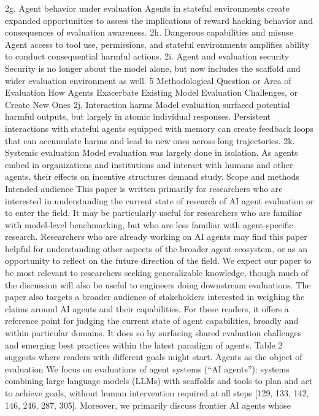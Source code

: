 2g. Agent behavior under evaluation
Agents in stateful environments create expanded opportunities to assess
the implications of reward hacking behavior and consequences of
evaluation awareness.
2h. Dangerous capabilities and misuse
Agent access to tool use, permissions, and stateful environments
amplifies ability to conduct consequential harmful actions.
2i. Agent and evaluation security
Security is no longer about the model alone, but now includes the
scaffold and wider evaluation environment as well.
5
Methodological Question or Area of
Evaluation
How Agents Exacerbate Existing Model Evaluation Challenges, or
Create New Ones
2j. Interaction harms
Model evaluation surfaced potential harmful outputs, but largely in
atomic individual responses. Persistent interactions with stateful agents
equipped with memory can create feedback loops that can accumulate
harms and lead to new ones across long trajectories.
2k. Systemic evaluation
Model evaluation was largely done in isolation. As agents embed in
organizations and institutions and interact with humans and other agents,
their effects on incentive structures demand study.
Scope and methods
Intended audience
This paper is written primarily for researchers who are interested in understanding the current state of
research of AI agent evaluation or to enter the field. It may be particularly useful for researchers who are
familiar with model-level benchmarking, but who are less familiar with agent-specific research. Researchers
who are already working on AI agents may find this paper helpful for understanding other aspects of the
broader agent ecosystem, or as an opportunity to reflect on the future direction of the field. We expect our
paper to be most relevant to researchers seeking generalizable knowledge, though much of the discussion
will also be useful to engineers doing downstream evaluations.
The paper also targets a broader audience of stakeholders interested in weighing the claims around AI
agents and their capabilities. For these readers, it offers a reference point for judging the current state
of agent capabilities, broadly and within particular domains. It does so by surfacing shared evaluation
challenges and emerging best practices within the latest paradigm of agents.
Table 2 suggests where readers with different goals might start.
Agents as the object of evaluation
We focus on evaluations of agent systems (“AI agents”): systems combining large language models (LLMs)
with scaffolds and tools to plan and act to achieve goals, without human intervention required at all
steps [129, 133, 142, 146, 246, 287, 305]. Moreover, we primarily discuss frontier AI agents whose
